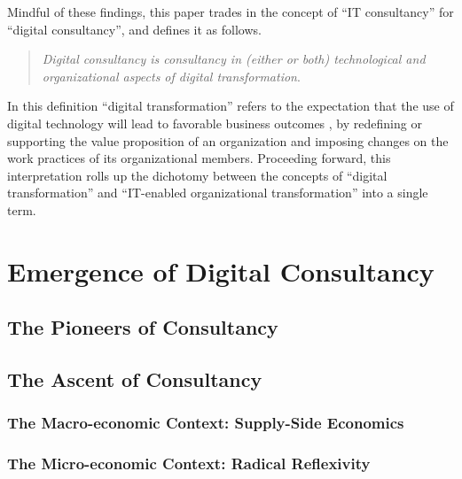 \documentclass[12pt]{article}
\begin{document}
Mindful of these findings, this paper trades in the concept of ``IT
consultancy'' for ``digital consultancy'', and defines it as follows.

\begin{quote}
\emph{Digital consultancy is consultancy in (either or both)
technological and organizational aspects of digital transformation}.
\end{quote}

In this definition ``digital transformation'' refers to the expectation
that the use of digital technology will lead to favorable business
outcomes \citep[ 104-118]{wessel2020}, by redefining or supporting the
value proposition of an organization and imposing changes on the work
practices of its organizational members. Proceeding forward, this
interpretation rolls up the dichotomy between the concepts of ``digital
transformation'' and ``IT-enabled organizational transformation'' into a
single term.

\hypertarget{emergence-of-digital-consultancy}{%
\section{Emergence of Digital
Consultancy}\label{emergence-of-digital-consultancy}}

\hypertarget{the-pioneers-of-consultancy}{%
\subsection{The Pioneers of
Consultancy}\label{the-pioneers-of-consultancy}}

\hypertarget{the-ascent-of-consultancy}{%
\subsection{The Ascent of Consultancy}\label{the-ascent-of-consultancy}}

\hypertarget{the-macro-economic-context-supply-side-economics}{%
\subsubsection{The Macro-economic Context: Supply-Side
Economics}\label{the-macro-economic-context-supply-side-economics}}

\hypertarget{the-micro-economic-context-radical-reflexivity}{%
\subsubsection{The Micro-economic Context: Radical
Reflexivity}\label{the-micro-economic-context-radical-reflexivity}}
\end{document}
